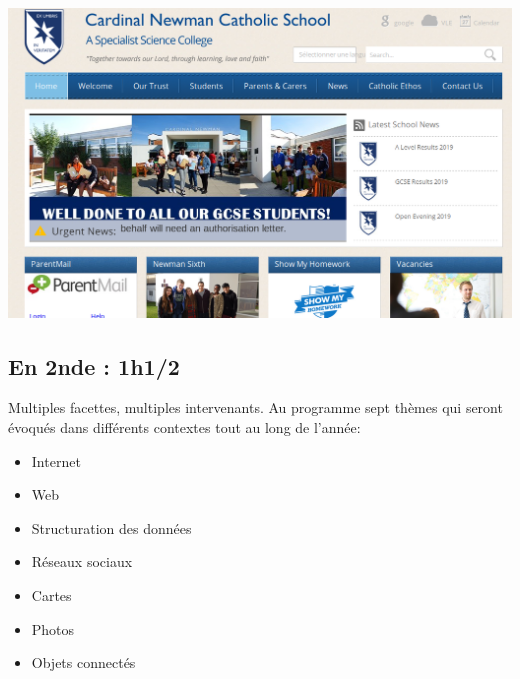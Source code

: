 \documentclass[french,handout]{beamer}
\begin{document}
\begin{frame}
  
\begin{center}
  \includegraphics[width=\linewidth]{cardinal}
\end{center}

\end{frame}



\subsection{En 2nde : 1h1/2}

\begin{frame}
\protect\hypertarget{organisation-de-lannuxe9e-que-va-t-on-uxe9tudier}{}

Multiples facettes, multiples intervenants. Au programme sept thèmes qui
seront évoqués dans différents contextes tout au long de l'année:

\begin{itemize}
\tightlist
\item
  Internet
\item
  Web
\item
  Structuration des données
\item
  Réseaux sociaux
\item
  Cartes
\item
  Photos
\item
  Objets connectés
\end{itemize}

\end{frame}
\end{document}
